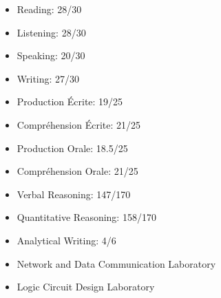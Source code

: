 
\begin{itemize}
    \item {Reading: 28/30}
    \item {Listening: 28/30}
    \item {Speaking: 20/30}
    \item {Writing: 27/30}
\end{itemize}

\divider

\begin{itemize}
    \item {Production Écrite: 19/25}
    \item {Compréhension Écrite: 21/25}
    \item {Production Orale: 18.5/25}
    \item {Compréhension Orale: 21/25}
\end{itemize}

\divider

\begin{itemize}
    \item {Verbal Reasoning: 147/170}
    \item {Quantitative Reasoning: 158/170}
    \item {Analytical Writing: 4/6}
\end{itemize}

\medskip
\begin{itemize}
    \item
    {Network and Data Communication Laboratory}
    \item
    {Logic Circuit Design Laboratory}
\end{itemize}

